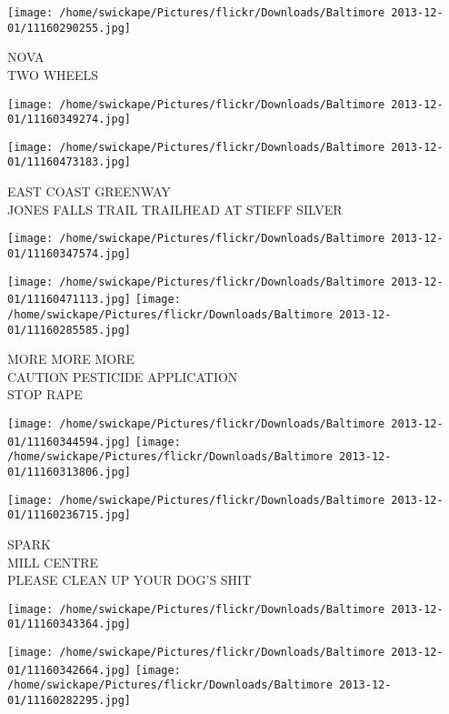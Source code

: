 \documentclass[10pt,letterpaper]{article}
\begin{document}
\vspace{0.25in}
\texttt{[image: /home/swickape/Pictures/flickr/Downloads/Baltimore 2013-12-01/11160290255.jpg]}

NOVA\\
TWO WHEELS\\
\pagebreak

\texttt{[image: /home/swickape/Pictures/flickr/Downloads/Baltimore 2013-12-01/11160349274.jpg]}

\vspace{0.25in}
\texttt{[image: /home/swickape/Pictures/flickr/Downloads/Baltimore 2013-12-01/11160473183.jpg]}

EAST COAST GREENWAY\\
JONES FALLS TRAIL TRAILHEAD AT STIEFF SILVER\\
\pagebreak

\texttt{[image: /home/swickape/Pictures/flickr/Downloads/Baltimore 2013-12-01/11160347574.jpg]}

\vspace{0.25in}
\texttt{[image: /home/swickape/Pictures/flickr/Downloads/Baltimore 2013-12-01/11160471113.jpg]}
\texttt{[image: /home/swickape/Pictures/flickr/Downloads/Baltimore 2013-12-01/11160285585.jpg]}

MORE MORE MORE\\
CAUTION PESTICIDE APPLICATION\\
STOP RAPE\\
\pagebreak

\texttt{[image: /home/swickape/Pictures/flickr/Downloads/Baltimore 2013-12-01/11160344594.jpg]}
\texttt{[image: /home/swickape/Pictures/flickr/Downloads/Baltimore 2013-12-01/11160313806.jpg]}

\texttt{[image: /home/swickape/Pictures/flickr/Downloads/Baltimore 2013-12-01/11160236715.jpg]}

SPARK\\
MILL CENTRE\\
PLEASE CLEAN UP YOUR DOG'S SHIT\\
\pagebreak

\texttt{[image: /home/swickape/Pictures/flickr/Downloads/Baltimore 2013-12-01/11160343364.jpg]}

\vspace{0.25in}
\texttt{[image: /home/swickape/Pictures/flickr/Downloads/Baltimore 2013-12-01/11160342664.jpg]}
\texttt{[image: /home/swickape/Pictures/flickr/Downloads/Baltimore 2013-12-01/11160282295.jpg]}
\end{document}
